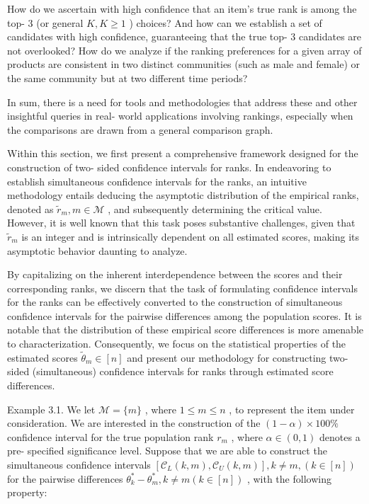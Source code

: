 How do we ascertain with high confidence that an item's true rank is
among the top- 3 (or general \(K,K\geq 1\) ) choices? And how can we
establish a set of candidates with high confidence, guaranteeing that
the true top- 3 candidates are not overlooked? How do we analyze if the
ranking preferences for a given array of products are consistent in two
distinct communities (such as male and female) or the same community but
at two different time periods?

In sum, there is a need for tools and methodologies that address these
and other insightful queries in real- world applications involving
rankings, especially when the comparisons are drawn from a general
comparison graph.

Within this section, we first present a comprehensive framework designed
for the construction of two- sided confidence intervals for ranks. In
endeavoring to establish simultaneous confidence intervals for the
ranks, an intuitive methodology entails deducing the asymptotic
distribution of the empirical ranks, denoted as
\(\widetilde{r}_{m},m\in \mathcal{M}\) , and subsequently determining
the critical value. However, it is well known that this task poses
substantive challenges, given that \(\widetilde{r}_{m}\) is an integer
and is intrinsically dependent on all estimated scores, making its
asymptotic behavior daunting to analyze.

By capitalizing on the inherent interdependence between the scores and
their corresponding ranks, we discern that the task of formulating
confidence intervals for the ranks can be effectively converted to the
construction of simultaneous confidence intervals for the pairwise
differences among the population scores. It is notable that the
distribution of these empirical score differences is more amenable to
characterization. Consequently, we focus on the statistical properties
of the estimated scores \(\widetilde{\theta}_{m} \in [n]\) and present
our methodology for constructing two- sided (simultaneous) confidence
intervals for ranks through estimated score differences.

Example 3.1. We let \(\mathcal{M} = \{m\}\) , where \(1 \leq m \leq n\)
, to represent the item under consideration. We are interested in the
construction of the \((1 - \alpha) \times 100\%\) confidence interval
for the true population rank \(r_{m}\) , where \(\alpha \in (0,1)\)
denotes a pre- specified significance level. Suppose that we are able to
construct the simultaneous confidence intervals
\([\mathcal{C}_L(k,m), \mathcal{C}_U(k,m)], k \neq m, (k \in [n])\) for
the pairwise differences
\(\theta_{k}^{*} - \theta_{m}^{*}, k \neq m (k \in [n])\) , with the
following property:

